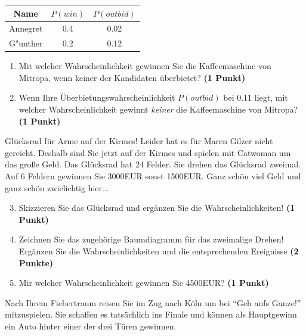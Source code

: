 \documentclass[a4paper, 9pt]{scrartcl}\usepackage[]{graphicx}\usepackage[]{xcolor}
\begin{document}
\begin{center}
\begin{tabular}{ccc}
  \toprule
  Name & $P(win)$ & $P(outbid)$\\
  \midrule
  Annegret & 0.4 & 0.02\\
  G{"u}nther & 0.2 & 0.12 \\
  \bottomrule
\end{tabular}
\end{center}

\begin{enumerate}
\item Mit welcher Wahrscheinlichkeit gewinnen Sie die Kaffeemaschine von
  Mitropa, wenn keiner der Kandidaten {\"u}berbietet? \textbf{(1 Punkt)}
\item Wenn Ihre {\"U}berbietungswahrscheinlichkeit $P(outbid)$ bei
  0.11 liegt, mit welcher Wahrscheinlichkeit gewinnt
  \textit{keiner} die Kaffeemaschine von Mitropa? \textbf{(1 Punkt)}
\end{enumerate}

Gl{\"u}cksrad f{\"u}r Arme auf der Kirmes! Leider hat es f{\"u}r Maren Gilzer nicht
gereicht. Deshalb sind Sie jetzt auf der Kirmes und spielen mit
Catwoman um das gro{\ss}e Geld. Das Gl{\"u}cksrad hat 24
Felder. Sie drehen das Gl{\"u}cksrad zweimal. Auf 6 Feldern
gewinnen Sie 3000EUR sonst 1500EUR. Ganz sch{\"o}n viel Geld
und ganz sch{\"o}n zwielichtig hier...

\begin{enumerate}
  \setcounter{enumi}{2}  
\item Skizzieren Sie das Gl{\"u}cksrad und erg{\"a}nzen Sie die
  Wahrscheinlichkeiten! \textbf{(1 Punkt)}
\item Zeichnen Sie das zugeh{\"o}rige Baumdiagramm f{\"u}r das zweimalige Drehen!
  Erg{\"a}nzen Sie die Wahrscheinlichkeiten und die entsprechenden Ereignisse
  \textbf{(2 Punkte)}
\item Mir welcher Wahrscheinlichkeit gewinnen Sie 4500EUR? \textbf{(1
    Punkt)}
\end{enumerate}

Nach Ihrem Fiebertraum reisen Sie im Zug nach K{\"o}ln um bei "`Geh aufs
Ganze!"' mitzuspielen. Sie schaffen es tats{\"a}chlich ins Finale und k{\"o}nnen
als Hauptgewinn ein Auto hinter einer der drei T{\"u}ren gewinnen. 
\end{document}
